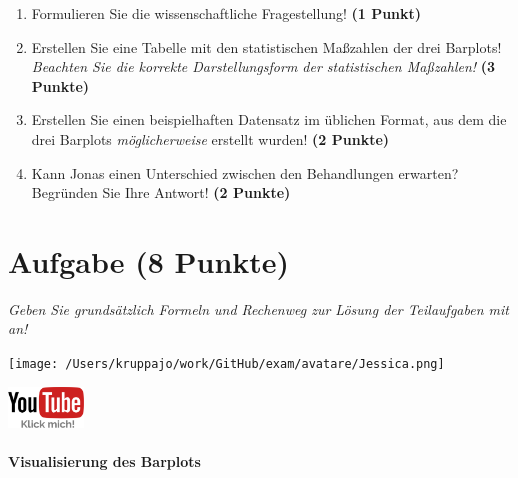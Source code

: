 \documentclass[a4paper, 9pt]{scrartcl}\usepackage[]{graphicx}\usepackage[]{xcolor}
\begin{document}
\begin{enumerate}
\item Formulieren Sie die wissenschaftliche Fragestellung! \textbf{(1 Punkt)}
\item Erstellen Sie eine Tabelle mit den statistischen Maßzahlen der drei Barplots! \textit{Beachten Sie die korrekte Darstellungsform der statistischen Maßzahlen!} \textbf{(3 Punkte)}
\item Erstellen Sie einen beispielhaften Datensatz im \Rlogo üblichen Format, aus dem die drei Barplots \textit{möglicherweise} erstellt wurden! \textbf{(2 Punkte)}
\item Kann Jonas einen Unterschied zwischen den Behandlungen erwarten? Begründen Sie Ihre Antwort! \textbf{(2 Punkte)}
\end{enumerate} 
\clearpage

\section{Aufgabe \hfill (8 Punkte)}

\textit{Geben Sie grundsätzlich Formeln und Rechenweg zur Lösung der Teilaufgaben mit an!} \\[1Ex]
 

 
\begin{minipage}[t]{0.5\textwidth}
\texttt{[image: /Users/kruppajo/work/GitHub/exam/avatare/Jessica.png]}
\end{minipage}
\begin{minipage}[t]{0.5\textwidth}
\hfill
\href{https://youtu.be/vXnLttRL_VI}{\includegraphics[width = 2cm]{img/youtube}}
\end{minipage}
\vspace{-3ex}



\paragraph{Visualisierung des Barplots}
\end{document}
